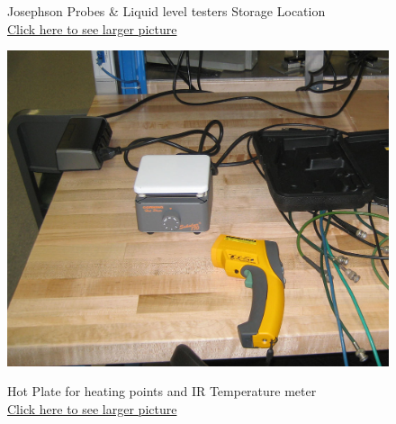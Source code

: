 \documentclass{../lab}
\begin{document}
\begin{figure}[H]
  \caption{Josephson Probes \& Liquid level testers Storage Location \\ \href{http://experimentationlab.berkeley.edu/sites/default/files/images/JOS-Probes_3506.jpg}{Click here to see larger picture}}\label{fig:JOS-Probes_3506.jpg}
\endminipage\hfill
{}
  \href{http://experimentationlab.berkeley.edu/sites/default/files/images/HotPlate-JOS_3505-Lg.jpg}{\includegraphics[width=\linewidth,keepaspectratio]{images/HotPlate-JOS_3505-Lg.jpg}}
  \caption{Hot Plate for heating points and IR Temperature meter \\ \href{http://experimentationlab.berkeley.edu/sites/default/files/images/HotPlate-JOS_3505-Lg.jpg}{Click here to see larger picture}}\label{fig:HotPlate-JOS_3505-Lg.jpg}
\endminipage\hfill
{}

\end{figure}
\end{document}
